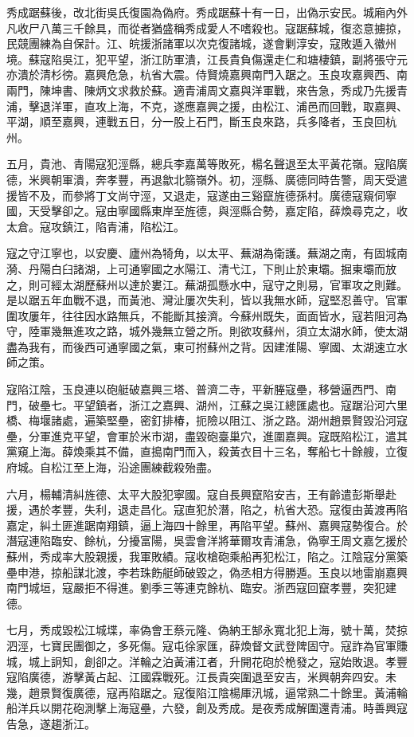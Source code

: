 \begin{pinyinscope}
秀成踞蘇後，改北街吳氏復園為偽府。秀成踞蘇十有一日，出偽示安民。城廂內外凡收尸八萬三千餘具，而從者猶盛稱秀成愛人不嗜殺也。寇踞蘇城，復恣意擄掠，民競團練為自保計。江、皖援浙諸軍以次克復諸城，遂會剿淳安，寇敗遁入徽州境。蘇寇陷吳江，犯平望，浙江防軍潰，江長貴負傷還走仁和塘棲鎮，副將張守元亦潰於清杉徬。嘉興危急，杭省大震。侍賢燒嘉興南門入踞之。玉良攻嘉興西、南兩門，陳坤書、陳炳文求救於蘇。適青浦周文嘉與洋軍戰，來告急，秀成乃先援青浦，擊退洋軍，直攻上海，不克，遂應嘉興之援，由松江、浦邑而回戰，取嘉興、平湖，順至嘉興，連戰五日，分一股上石門，斷玉良來路，兵多降者，玉良回杭州。

五月，貴池、青陽寇犯涇縣，總兵李嘉萬等敗死，楊名聲退至太平黃花嶺。寇陷廣德，米興朝軍潰，奔孝豐，再退歙北篛嶺外。初，涇縣、廣德同時告警，周天受遣援皆不及，而參將丁文尚守涇，又退走，寇遂由三谿竄旌德孫村。廣德寇窺伺寧國，天受擊卻之。寇由寧國縣東岸至旌德，與涇縣合勢，嘉定陷，薛煥尋克之，收太倉。寇攻鎮江，陷青浦，陷松江。

寇之守江寧也，以安慶、廬州為犄角，以太平、蕪湖為衛護。蕪湖之南，有固城南漪、丹陽白臼諸湖，上可通寧國之水陽江、清弋江，下則止於東壩。掘東壩而放之，則可經太湖歷蘇州以達於婁江。蕪湖孤懸水中，寇守之則易，官軍攻之則難。是以踞五年血戰不退，而黃池、灣沚屢次失利，皆以我無水師，寇堅忍善守。官軍圍攻屢年，往往因水路無兵，不能斷其接濟。今蘇州既失，面面皆水，寇若阻河為守，陸軍幾無進攻之路，城外幾無立營之所。則欲攻蘇州，須立太湖水師，使太湖盡為我有，而後西可通寧國之氣，東可拊蘇州之背。因建淮陽、寧國、太湖速立水師之策。

寇陷江陰，玉良連以砲艇破嘉興三塔、普濟二寺，平新塍寇壘，移營逼西門、南門，破壘七。平望鎮者，浙江之嘉興、湖州，江蘇之吳江總匯處也。寇踞沿河六里橋、梅堰諸處，遍築堅壘，密釘排椿，扼險以阻江、浙之路。湖州趙景賢毀沿河寇壘，分軍進克平望，會軍於米市湖，盡毀砲臺巢穴，進圍嘉興。寇既陷松江，遣其黨窺上海。薛煥乘其不備，直搗南門而入，殺黃衣目十三名，奪船七十餘艘，立復府城。自松江至上海，沿途團練截殺殆盡。

六月，楊輔清糾旌德、太平大股犯寧國。寇自長興竄陷安吉，王有齡遣彭斯舉赴援，遇於孝豐，失利，退走昌化。寇直犯於潛，陷之，杭省大恐。寇復由黃渡再陷嘉定，糾土匪進踞南翔鎮，逼上海四十餘里，再陷平望。蘇州、嘉興寇勢復合。於潛寇連陷臨安、餘杭，分擾富陽，吳雲會洋將華爾攻青浦急，偽寧王周文嘉乞援於蘇州，秀成率大股親援，我軍敗績。寇收槍砲乘船再犯松江，陷之。江陰寇分黨築壘申港，掠船謀北渡，李若珠飭艇師破毀之，偽丞相方得勝遁。玉良以地雷崩嘉興南門城垣，寇嚴拒不得進。劉季三等連克餘杭、臨安。浙西寇回竄孝豐，突犯建德。

七月，秀成毀松江城堞，率偽會王蔡元隆、偽納王郜永寬北犯上海，號十萬，焚掠泗涇，七寶民團御之，多死傷。寇屯徐家匯，薛煥督文武登陴固守。寇詐為官軍賺城，城上詗知，創卻之。洋輪之泊黃浦江者，升開花砲於桅發之，寇始敗退。孝豐寇陷廣德，游擊黃占起、江國霖戰死。江長貴突圍退至安吉，米興朝奔四安。未幾，趙景賢復廣德，寇再陷踞之。寇復陷江陰楊厙汛城，逼常熟二十餘里。黃浦輪船洋兵以開花砲測擊上海寇壘，六發，創及秀成。是夜秀成解圍還青浦。時善興寇告急，遂趨浙江。


\end{pinyinscope}
